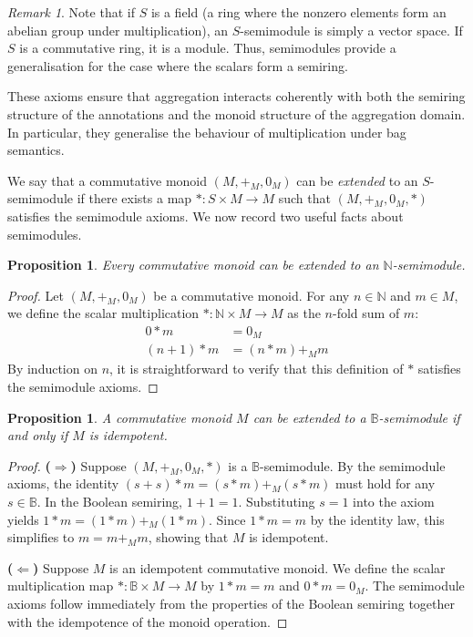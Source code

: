 \documentclass[oneside, 11pt]{amsbook}
\theoremstyle{plain}
\newtheorem{prop}[thm]{Proposition}
\theoremstyle{definition}
\theoremstyle{remark}
\newtheorem*{remark}{Remark}
\begin{document}
\begin{remark}
    Note that if $S$ is a field (a ring where the nonzero elements form an abelian group under multiplication), an $S$-semimodule is simply a vector space. If $S$ is a commutative ring, it is a module. Thus, semimodules provide a generalisation for the case where the scalars form a semiring.
\end{remark}

These axioms ensure that aggregation interacts coherently with both the semiring structure of the annotations and the monoid structure of the aggregation domain. In particular, they generalise the behaviour of multiplication under bag semantics.

We say that a commutative monoid $(M, +_M, 0_M)$ can be \emph{extended} to an $S$-semimodule if there exists a map $\ast : S \times M \to M$ such that $(M, +_M, 0_M, \ast)$ satisfies the semimodule axioms. We now record two useful facts about semimodules.

\begin{prop}
    \label{prop:allcommutativemonoidsNsemimodules}
    Every commutative monoid can be extended to an $\mathbb{N}$-semimodule.
\end{prop}
\begin{proof}
    Let $(M, +_M, 0_M)$ be a commutative monoid. For any $n \in \mathbb{N}$ and $m \in M$, we define the scalar multiplication $\ast : \mathbb{N} \times M \to M$ as the $n$-fold sum of $m$:
    \begin{align*}
        0 \ast m       & = 0_M              \\
        (n + 1) \ast m & = (n \ast m) +_M m
    \end{align*}
    By induction on $n$, it is straightforward to verify that this definition of $\ast$ satisfies the semimodule axioms.
\end{proof}

\begin{prop}
    \label{prop:Bsemimoduleiffidempotentmonoid}
    A commutative monoid $M$ can be extended to a $\mathbb{B}$-semimodule if and only if $M$ is idempotent.
\end{prop}
\begin{proof}
    \textbf{($\Rightarrow$)}
    Suppose $(M, +_M, 0_M, \ast)$ is a $\mathbb{B}$-semimodule. By the semimodule axioms, the identity $(s + s) \ast m = (s \ast m) +_M (s \ast m)$ must hold for any $s \in \mathbb{B}$. In the Boolean semiring, $1 + 1 = 1$. Substituting $s = 1$ into the axiom yields $1 \ast m = (1 \ast m) +_M (1 \ast m)$. Since $1 \ast m = m$ by the identity law, this simplifies to $m = m +_M m$, showing that $M$ is idempotent.

    \textbf{($\Leftarrow$)}
    Suppose $M$ is an idempotent commutative monoid. We define the scalar multiplication map $\ast : \mathbb{B} \times M \to M$ by $1 \ast m = m$ and $0 \ast m = 0_M$. The semimodule axioms follow immediately from the properties of the Boolean semiring together with the idempotence of the monoid operation.
\end{proof}
\end{document}

